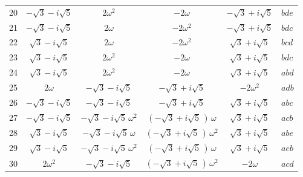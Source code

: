 \documentclass[11pt]{article}
\begin{document}
\begin{center}
\begin{longtable}{r|cccc|l}
20 & $-\sqrt{3} - i\sqrt{5}$ & $2\omega^{2}$ & $-2\omega$ & $-\sqrt{3} + i\sqrt{5}$ & $bde$\\
21 & $-\sqrt{3} - i\sqrt{5}$ & $2\omega$ & $-2\omega^{2}$ & $-\sqrt{3} + i\sqrt{5}$ & $bdc$\\
22 & $\sqrt{3} - i\sqrt{5}$ & $2\omega$ & $-2\omega^{2}$ & $\sqrt{3} + i\sqrt{5}$ & $bcd$\\
23 & $\sqrt{3} - i\sqrt{5}$ & $2\omega^{2}$ & $-2\omega$ & $\sqrt{3} + i\sqrt{5}$ & $bdc$\\
24 & $\sqrt{3} - i\sqrt{5}$ & $2\omega^{2}$ & $-2\omega$ & $\sqrt{3} + i\sqrt{5}$ & $abd$\\
25 & $2\omega$ & $-\sqrt{3} - i\sqrt{5}$ & $-\sqrt{3} + i\sqrt{5}$ & $-2\omega^{2}$ & $adb$\\
26 & $-\sqrt{3} - i\sqrt{5}$ & $-\sqrt{3} - i\sqrt{5}$ & $-\sqrt{3} + i\sqrt{5}$ & $\sqrt{3} + i\sqrt{5}$ & $abc$\\
27 & $-\sqrt{3} - i\sqrt{5}$ & $-\sqrt{3} - i\sqrt{5}\,\omega^{2}$ & $(-\sqrt{3} + i\sqrt{5}\,)\,\omega$ & $\sqrt{3} + i\sqrt{5}$ & $acb$\\
28 & $\sqrt{3} - i\sqrt{5}$ & $-\sqrt{3} - i\sqrt{5}\,\omega$ & $(-\sqrt{3} + i\sqrt{5}\,)\,\omega^{2}$ & $\sqrt{3} + i\sqrt{5}$ & $abe$\\
29 & $\sqrt{3} - i\sqrt{5}$ & $-\sqrt{3} - i\sqrt{5}\,\omega^{2}$ & $(-\sqrt{3} + i\sqrt{5}\,)\,\omega$ & $\sqrt{3} + i\sqrt{5}$ & $aeb$\\
30 & $2\omega^{2}$ & $-\sqrt{3} - i\sqrt{5}$ & $(-\sqrt{3} + i\sqrt{5}\,)\,\omega^{2}$ & $-2\omega$ & $acd$\\


\end{longtable}
\end{center}
\end{document}
